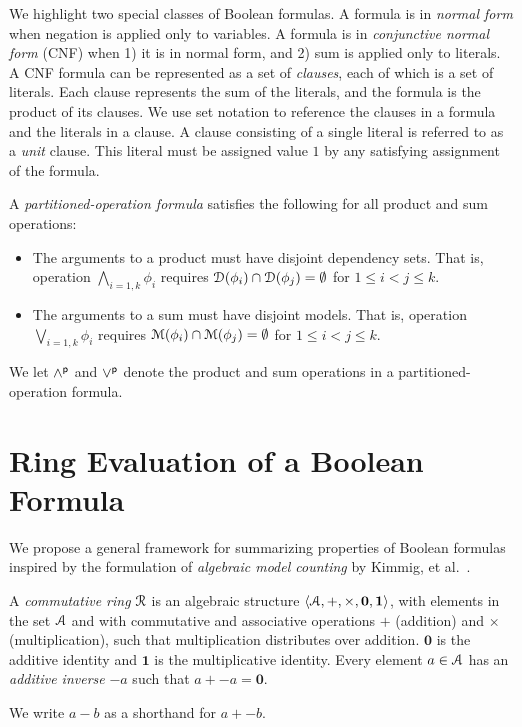 \documentclass[letterpaper,USenglish,cleveref, autoref, thm-restate]{lipics-v2021}
\newcommand{\pand}{\mathbin{\land^{\sf p}}}
\newcommand{\por}{\mathbin{\lor^{\sf p}}}
\newcommand{\dependencyset}{{\cal D}}
\newcommand{\ring}{{\cal R}}
\newcommand{\dset}{{\cal A}}
\newcommand{\radd}{+}
\newcommand{\rmul}{\times}
\newcommand{\addident}{\textbf{0}}
\newcommand{\mulident}{\textbf{1}}
\newcommand{\modelset}{{\cal M}}
\begin{document}
  We highlight two special classes of Boolean formulas.  A formula is
  in {\em normal form} when negation is applied only to variables.  A
  formula is in {\em conjunctive normal form} (CNF) when 1) it is in
  normal form, and 2) sum is applied only to literals.  A CNF
  formula can be represented as a set of {\em clauses}, each of which is a
  set of literals.  Each clause represents the sum of the
  literals, and the formula is the product of its clauses.  We use
  set notation to reference the clauses in a formula and the
  literals in a clause.  A clause consisting of a single literal is referred to as a {\em unit} clause.
This literal must be assigned value $1$ by any satisfying assignment of the formula.

  A {\em partitioned-operation formula}
 satisfies the following for all product and sum operations:
      \begin{itemize}
      \item The arguments to a product must have disjoint dependency sets.  That is, operation
        $\bigwedge_{i=1,k} \phi_i$ requires $\dependencyset(\phi_i) \cap \dependencyset(\phi_j) = \emptyset$ for $1 \leq i < j \leq k$.
      \item The arguments to a sum must have disjoint models.  That is, operation
        $\bigvee_{i=1,k} \phi_i$ requires $\modelset(\phi_i) \cap \modelset(\phi_j) = \emptyset$ for $1 \leq i < j \leq k$.
      \end{itemize}
     We let $\pand$ and $\por$ denote the product and sum operations in a partitioned-operation formula.

  \section{Ring Evaluation of a Boolean Formula}

We propose a general framework for summarizing properties of Boolean
formulas inspired by the formulation of {\em algebraic model counting}
by Kimmig, et al.~\cite{kimmig:jal:2017}.

\begin{definition}
  A {\em commutative ring} $\ring$ is an algebraic structure
  $\langle \dset, \radd, \rmul, \addident, \mulident \rangle$,
  with elements in the set $\dset$ and with commutative and
  associative operations $\radd$ (addition) and $\rmul$ (multiplication),
  such that multiplication distributes
  over addition.  $\addident$ is the additive identity and $\mulident$ is
  the multiplicative identity.  Every element $a \in \dset$ has an
  {\em additive inverse} $-a$ such that $a + -a = \addident$.
\label{def:ring}
\end{definition}
We write $a - b$ as a shorthand for $a + -b$.
\end{document}
